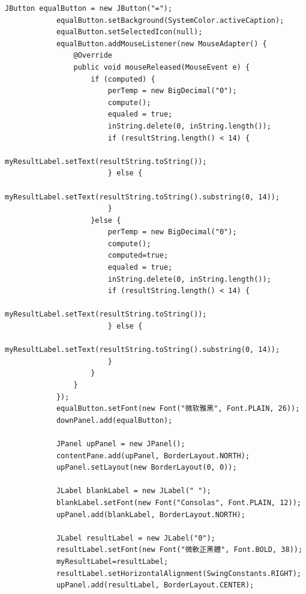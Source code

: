 \documentclass{ctexart}
\begin{document}
\begin{lstlisting}[caption=冗杂的代码]
            JButton equalButton = new JButton("=");
            equalButton.setBackground(SystemColor.activeCaption);
            equalButton.setSelectedIcon(null);
            equalButton.addMouseListener(new MouseAdapter() {
                @Override
                public void mouseReleased(MouseEvent e) {
                    if (computed) {
                        perTemp = new BigDecimal("0");
                        compute();
                        equaled = true;
                        inString.delete(0, inString.length());
                        if (resultString.length() < 14) {
                            myResultLabel.setText(resultString.toString());
                        } else {
                            myResultLabel.setText(resultString.toString().substring(0, 14));
                        } 
                    }else {
                        perTemp = new BigDecimal("0");
                        compute();
                        computed=true;
                        equaled = true;
                        inString.delete(0, inString.length());
                        if (resultString.length() < 14) {
                            myResultLabel.setText(resultString.toString());
                        } else {
                            myResultLabel.setText(resultString.toString().substring(0, 14));
                        } 
                    }
                }
            });
            equalButton.setFont(new Font("微软雅黑", Font.PLAIN, 26));
            downPanel.add(equalButton);
            
            JPanel upPanel = new JPanel();
            contentPane.add(upPanel, BorderLayout.NORTH);
            upPanel.setLayout(new BorderLayout(0, 0));
            
            JLabel blankLabel = new JLabel(" ");
            blankLabel.setFont(new Font("Consolas", Font.PLAIN, 12));
            upPanel.add(blankLabel, BorderLayout.NORTH);
            
            JLabel resultLabel = new JLabel("0");
            resultLabel.setFont(new Font("微軟正黑體", Font.BOLD, 38));
            myResultLabel=resultLabel;
            resultLabel.setHorizontalAlignment(SwingConstants.RIGHT);	
            upPanel.add(resultLabel, BorderLayout.CENTER);
            

\end{lstlisting}
\end{document}
